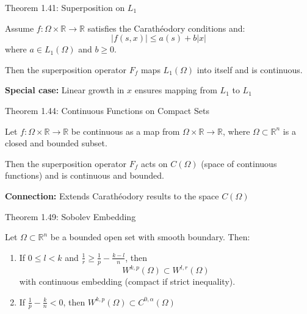 \documentclass[aspectratio=169,10pt]{beamer}
\begin{document}
\begin{frame}{Theorem 1.41: Superposition on $L_1$}
    \begin{theorem}
        Assume $f: \Omega \times \mathbb{R} \to \mathbb{R}$ satisfies the Carathéodory conditions and:
        \[
            |f(s, x)| \leq a(s) + b|x|
        \]
        where $a \in L_1(\Omega)$ and $b \geq 0$.

        Then the superposition operator $F_f$ maps $L_1(\Omega)$ into itself and is continuous.
    \end{theorem}

    \vspace{0.3cm}
    \textbf{Special case:} Linear growth in $x$ ensures mapping from $L_1$ to $L_1$
\end{frame}

\begin{frame}{Theorem 1.44: Continuous Functions on Compact Sets}
    \begin{theorem}
        Let $f: \Omega \times \mathbb{R} \to \mathbb{R}$ be continuous as a map from $\Omega \times \mathbb{R} \to \mathbb{R}$, where $\Omega \subset \mathbb{R}^n$ is a closed and bounded subset.

        Then the superposition operator $F_f$ acts on $C(\Omega)$ (space of continuous functions) and is continuous and bounded.
    \end{theorem}

    \vspace{0.3cm}
    \textbf{Connection:} Extends Carathéodory results to the space $C(\Omega)$
\end{frame}

\begin{frame}{Theorem 1.49: Sobolev Embedding}
    \begin{theorem}
        Let $\Omega \subset \mathbb{R}^n$ be a bounded open set with smooth boundary. Then:

        \begin{enumerate}
            \item If $0 \leq l < k$ and $\frac{1}{r} \geq \frac{1}{p} - \frac{k-l}{n}$, then
            \[
                W^{k,p}(\Omega) \subset W^{l,r}(\Omega)
            \]
            with continuous embedding (compact if strict inequality).

            \item If $\frac{1}{p} - \frac{k}{n} < 0$, then $W^{k,p}(\Omega) \subset C^{0,\alpha}(\Omega)$
        \end{enumerate}
    \end{theorem}
\end{frame}
\end{document}

